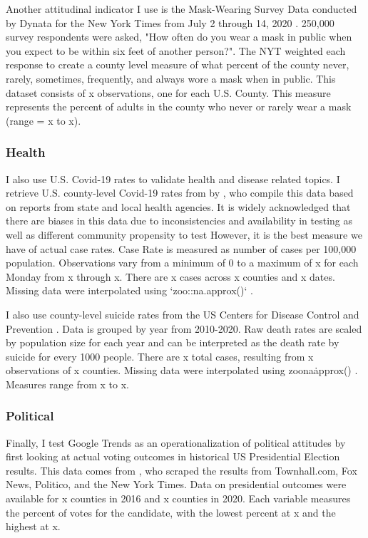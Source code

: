 Another attitudinal indicator I use is the Mask-Wearing Survey Data conducted by
Dynata for the New York Times from July 2 through 14, 2020 \citep{mask_data}. 250,000
survey respondents were asked, "How often do you wear a mask in public when you
expect to be within six feet of another person?". The NYT weighted each response
to create a county level measure of what percent of the county never, rarely,
sometimes, frequently, and always wore a mask when in public. This dataset
consists of x observations, one for each U.S. County. This measure
represents the percent of adults in the county who never or rarely wear a mask
(range = x to x).

\subsubsection{Health}


I also use U.S. Covid-19 rates to validate health and disease related topics. I
retrieve U.S. county-level Covid-19 rates from by \citet{covid_data}, who compile this
data based on reports from state and local health agencies. It is widely
acknowledged that there are biases in this data due to inconsistencies and
availability in testing as well as different community propensity to test
\citep{gu22, cdc20a} However, it is the best measure we have of actual case rates.
Case Rate is measured as number of cases per 100,000 population. Observations
vary from a minimum of 0 to a maximum of x for each 
Monday from x through x. There are x cases across x counties and x dates. Missing data were interpolated using `zoo::na.approx()` \citep{zoo}.

I also use county-level suicide rates from the US Centers for Disease Control
and Prevention \citeyearpar{suic_data}. Data is grouped by year from 2010-2020. Raw death
rates are scaled by population size for each year and can be interpreted as the
death rate by suicide for every 1000 people. There are x total
cases, resulting from x observations of x counties. Missing data were interpolated using
zoo\:\:na\.approx() \citep{zoo}. Measures range from x to x.

\subsubsection{Political}

Finally, I test Google Trends as an operationalization of political
attitudes by first looking at actual voting outcomes in historical US
Presidential Election results. This data comes from  \citet{pres_data}, who scraped the
results from Townhall.com, Fox News, Politico, and the New York Times. Data on 
presidential outcomes were available for x counties in 2016 and
x counties in 2020. Each variable measures the percent of votes
for the candidate, with the lowest percent at x and the highest at x. 

